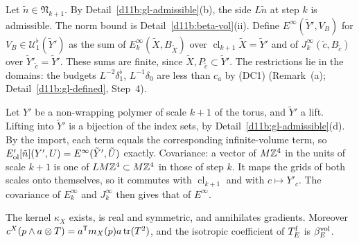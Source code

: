 \begin{step}[Proof]
Let $\tilde n\in\mathfrak N_{k+1}$. By Detail~\ref{d11b:gl-admissible}(b), the side $L\tilde n$ at step $k$ is admissible. The norm bound is Detail~\ref{d11b:beta-vol}(ii). Define $E^\infty(\tilde Y',V_B)$ for $V_B\in\mathcal U^\flat_1(\tilde Y')$ as the sum of $E^\infty_k(\tilde X,B_{\tilde X})$ over $\operatorname{cl}_{k+1}\tilde X=\tilde Y'$ and of $J^\infty_k(\tilde c,B_{\tilde c})$ over $\tilde Y'_{\tilde c}=\tilde Y'$. These sums are finite, since $\tilde X,P_{\tilde c}\subset\tilde Y'$. The restrictions lie in the domains: the budgets $L^{-2}\delta_1^\flat$, $L^{-1}\delta_0$ are less than $c_a$ by (DC1) (Remark~(a); Detail~\ref{d11b:gl-defined}, Step~4).

Let $Y'$ be a non-wrapping polymer of scale $k+1$ of the torus, and $\tilde Y'$ a lift. Lifting into $\tilde Y'$ is a bijection of the index sets, by Detail~\ref{d11b:gl-admissible}(d). By the import, each term equals the corresponding infinite-volume term, so $E'_{\rm ol}[\tilde n](Y',U)=E^\infty(\tilde Y',\tilde U)$ exactly. Covariance: a vector of $M\mathbb Z^4$ in the units of scale $k+1$ is one of $LM\mathbb Z^4\subset M\mathbb Z^4$ in those of step $k$. It maps the grids of both scales onto themselves, so it commutes with $\operatorname{cl}_{k+1}$ and with $c\mapsto Y'_c$. The covariance of $E^\infty_k$ and $J^\infty_k$ then gives that of $E^\infty$.
\end{step}

\begin{detail}\label{d11b:pv-ab}
The kernel $\kappa_X$ exists, is real and symmetric, and annihilates gradients. Moreover $c^X(p\wedge a\otimes T)=a^{\sf T}m_X(p)a\operatorname{tr}(T^2)$, and the isotropic coefficient of $T^{\rm f}_E$ is $\beta^{\rm vol}_E$.
\end{detail}

